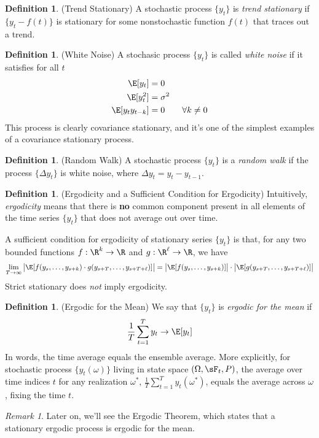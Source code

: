 \documentclass[12pt]{article}
\theoremstyle{plain}
\theoremstyle{definition}
\newtheorem{defn}[thm]{Definition}
\theoremstyle{remark}
\newtheorem*{rmk}{Remark}
\newcommand{\ra}{\rightarrow}
\newcommand{\sumtT}{\sum^T_{t=1}}
\begin{document}
\begin{defn}(Trend Stationary)
A stochastic process $\{y_t\}$ is \emph{trend stationary} if
$\{y_t-f(t)\}$ is stationary for some nonstochastic function $f(t)$ that
traces out a trend.
\end{defn}


\begin{defn}(White Noise)
A stochasic process $\{y_t\}$ is called \emph{white noise} if it
satisfies for all $t$
\begin{align*}
  \E[y_t] &= 0
  \\
  \E[y_t^2] &= \sigma^2
  \\
  \E[y_ty_{t-k}] &= 0 \qquad \forall k\neq 0
\end{align*}
This process is clearly covariance stationary, and it's one of the
simplest examples of a covariance stationary process.
\end{defn}

\begin{defn}(Random Walk)
A stochastic process $\{y_t\}$ is a \emph{random walk} if the process
$\{\Delta y_t\}$ is white noise, where $\Delta y_t = y_t-y_{t-1}$.
\end{defn}

\begin{defn}(Ergodicity and a Sufficient Condition for Ergodicity)
Intuitively, \emph{ergodicity} means that there is \textbf{no} common
component present in all elements of the time series $\{y_t\}$ that
does not average out over time.

A sufficient condition for ergodicity of stationary series $\{y_t\}$ is
that, for any two bounded functions $f:\R^k\ra \R$ and $g:\R^\ell\ra\R$,
we have
\begin{align*}
  \lim_{T\ra\infty}
  \big|
  \E[
    f(y_s,\ldots,y_{s+k})
    \cdot
    g(y_{s+T},\ldots,y_{s+T+\ell})
  ]
  \big|
  =
  \big|
  \E[
    f(y_s,\ldots,y_{s+k})
  ]\big|
    \cdot
  \big|
  \E[
  g(y_{s+T},\ldots,y_{s+T+\ell})]
  \big|
\end{align*}
Strict stationary does \emph{not} imply ergodicity.
\end{defn}

\begin{defn}(Ergodic for the Mean)
We say that $\{y_t\}$ is \emph{ergodic for the mean} if
\begin{align*}
  \frac{1}{T}\sum^T_{t=1}y_t \ra \E[y_t]
\end{align*}
In words, the time average equals the ensemble average. More explicitly,
for stochastic process $\{y_t(\omega)\}$ living in state space
$(\Omega,\sF_t,P)$, the average over time indices $t$ for any
realization $\omega^*$, $\frac{1}{T}\sumtT y_t(\omega^*)$, equals the
average across $\omega$, fixing the time $t$.
\end{defn}
\begin{rmk}
Later on, we'll see the Ergodic Theorem, which states that a stationary
ergodic process is ergodic for the mean.
\end{rmk}
\end{document}
